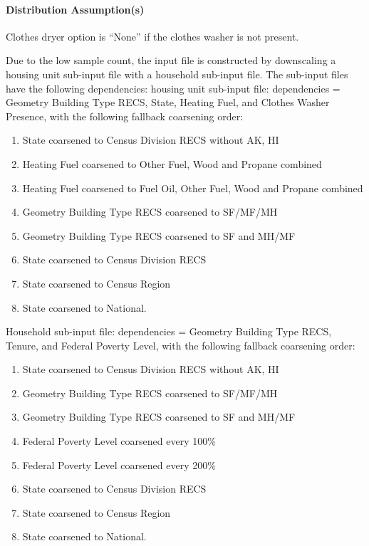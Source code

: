 \paragraph{Distribution Assumption(s)}
Clothes dryer option is ``None'' if the clothes washer is not present.

Due to the low sample count, the input file is constructed by downscaling a housing unit sub-input file with a household sub-input file. The sub-input files have the following dependencies: 
housing unit sub-input file: dependencies = Geometry Building Type RECS, State, Heating Fuel, and Clothes Washer Presence, with the following fallback coarsening order:
\begin{enumerate}
    \item State coarsened to Census Division RECS without AK, HI 
    \item  Heating Fuel coarsened to Other Fuel, Wood and Propane combined 
    \item Heating Fuel coarsened to Fuel Oil, Other Fuel, Wood and Propane combined 
    \item Geometry Building Type RECS coarsened to SF/MF/MH
    \item  Geometry Building Type RECS coarsened to SF and MH/MF 
    \item  State coarsened to Census Division RECS 
    \item State coarsened to Census Region 
    \item State coarsened to National. 
\end{enumerate}

Household sub-input file: dependencies = Geometry Building Type RECS, Tenure, and Federal Poverty Level, with the following fallback coarsening order:
\begin{enumerate}
\item  State coarsened to Census Division RECS without AK, HI 
\item  Geometry Building Type RECS coarsened to SF/MF/MH 
\item  Geometry Building Type RECS coarsened to SF and MH/MF 
\item  Federal Poverty Level coarsened every 100\% 
\item Federal Poverty Level coarsened every 200\%
\item  State coarsened to Census Division RECS
\item State coarsened to Census Region
\item State coarsened to National.
\end{enumerate}

